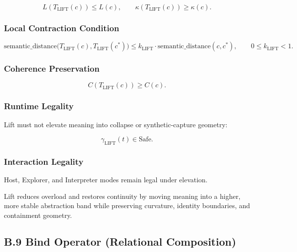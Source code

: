 \[
L(T_{\mathrm{LIFT}}(c)) \le L(c),
\qquad
\kappa(T_{\mathrm{LIFT}}(c)) \ge \kappa(c).
\]



\subsubsection*{Local Contraction Condition}



\[
\text{semantic\_distance}\big(T_{\mathrm{LIFT}}(c), T_{\mathrm{LIFT}}(c^*)\big)
\le k_{\mathrm{LIFT}} \cdot \text{semantic\_distance}(c, c^*),
\qquad 0 \le k_{\mathrm{LIFT}} < 1.
\]



\subsubsection*{Coherence Preservation}



\[
C(T_{\mathrm{LIFT}}(c)) \ge C(c).
\]



\subsubsection*{Runtime Legality}

Lift must not elevate meaning into collapse or synthetic-capture geometry:



\[
\gamma_{\mathrm{LIFT}}(t) \in \text{Safe}.
\]



\subsubsection*{Interaction Legality}

Host, Explorer, and Interpreter modes remain legal under elevation.

\medskip

\noindent Lift reduces overload and restores continuity by moving meaning into a
higher, more stable abstraction band while preserving curvature, identity
boundaries, and containment geometry.


\subsection*{B.9 Bind Operator (Relational Composition)}

